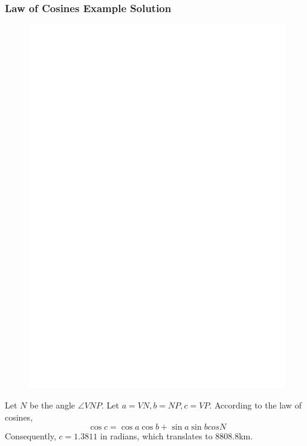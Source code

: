 \documentclass[xcolor=dvipsnames]{beamer}
\begin{document}
\begin{frame}
  \frametitle{Law of Cosines Example Solution}
\begin{figure}[h]
\includegraphics[scale=.4]{./VancouverPalma1.eps}
\end{figure}
Let $N$ be the angle $\angle{}VNP$. Let $a=VN,b=NP,c=VP$. According to
the law of cosines,
\begin{equation}
  \label{eq:aechiedu}
  \cos{}c=\cos{}a\cos{}b+\sin{}a\sin{}b{}cos{}N
\end{equation}
Consequently, $c=1.3811$ in radians, which translates to $8808.8$km.
\end{frame}
\end{document}
